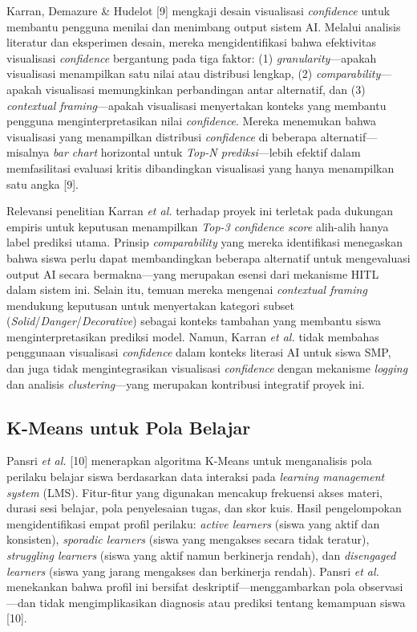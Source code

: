 Karran, Demazure \& Hudelot [9] mengkaji desain visualisasi \textit{confidence} untuk membantu pengguna menilai dan menimbang output sistem AI. Melalui analisis literatur dan eksperimen desain, mereka mengidentifikasi bahwa efektivitas visualisasi \textit{confidence} bergantung pada tiga faktor: (1) \textit{granularity}—apakah visualisasi menampilkan satu nilai atau distribusi lengkap, (2) \textit{comparability}—apakah visualisasi memungkinkan perbandingan antar alternatif, dan (3) \textit{contextual framing}—apakah visualisasi menyertakan konteks yang membantu pengguna menginterpretasikan nilai \textit{confidence}. Mereka menemukan bahwa visualisasi yang menampilkan distribusi \textit{confidence} di beberapa alternatif—misalnya \textit{bar chart} horizontal untuk \textit{Top-N prediksi}—lebih efektif dalam memfasilitasi evaluasi kritis dibandingkan visualisasi yang hanya menampilkan satu angka [9].

Relevansi penelitian Karran \textit{et al.} terhadap proyek ini terletak pada dukungan empiris untuk keputusan menampilkan \textit{Top-3 confidence score} alih-alih hanya label prediksi utama. Prinsip \textit{comparability} yang mereka identifikasi menegaskan bahwa siswa perlu dapat membandingkan beberapa alternatif untuk mengevaluasi output AI secara bermakna—yang merupakan esensi dari mekanisme HITL dalam sistem ini. Selain itu, temuan mereka mengenai \textit{contextual framing} mendukung keputusan untuk menyertakan kategori subset (\textit{Solid}/\textit{Danger}/\textit{Decorative}) sebagai konteks tambahan yang membantu siswa menginterpretasikan prediksi model. Namun, Karran \textit{et al.} tidak membahas penggunaan visualisasi \textit{confidence} dalam konteks literasi AI untuk siswa SMP, dan juga tidak mengintegrasikan visualisasi \textit{confidence} dengan mekanisme \textit{logging} dan analisis \textit{clustering}—yang merupakan kontribusi integratif proyek ini.

\subsection{K-Means untuk Pola Belajar}
\label{subsec:penelitian-kmeans}

Pansri \textit{et al.} [10] menerapkan algoritma K-Means untuk menganalisis pola perilaku belajar siswa berdasarkan data interaksi pada \textit{learning management system} (LMS). Fitur-fitur yang digunakan mencakup frekuensi akses materi, durasi sesi belajar, pola penyelesaian tugas, dan skor kuis. Hasil pengelompokan mengidentifikasi empat profil perilaku: \textit{active learners} (siswa yang aktif dan konsisten), \textit{sporadic learners} (siswa yang mengakses secara tidak teratur), \textit{struggling learners} (siswa yang aktif namun berkinerja rendah), dan \textit{disengaged learners} (siswa yang jarang mengakses dan berkinerja rendah). Pansri \textit{et al.} menekankan bahwa profil ini bersifat deskriptif—menggambarkan pola observasi—dan tidak mengimplikasikan diagnosis atau prediksi tentang kemampuan siswa [10].

